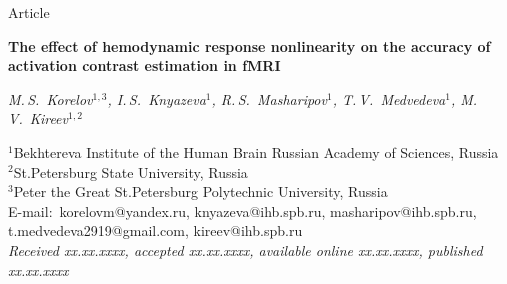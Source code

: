 \documentclass[11pt,twoside,a4paper]{article}
\newcommand{\published}{xx.xx.xxxx}
\renewcommand{\received}{xx.xx.xxxx}
\renewcommand{\accepted}{xx.xx.xxxx}
\renewcommand{\onlinepublished}{xx.xx.xxxx}
\renewcommand{\titpaperen}{The effect of hemodynamic response nonlinearity on the accuracy of activation contrast estimation in fMRI}
\begin{document}
\label{firstpage}
\thispagestyle{firststyle}
\vspace*{.2cm}
\infojournal
\vspace*{.8cm}

{\small \noindent
	Article\hfill \doi\\

}\vspace{.4cm}

\begin{center}\textbf{\large \titpaperen}
	\vspace{1\baselineskip}
	
\emph{M.\,S.~Korelov$^{1,3}$, I.\,S.~Knyazeva$^{1}$, R.\,S.~Masharipov$^{1}$, T.\,V.~Medvedeva$^{1}$, M.\,V.~Kireev$^{1,2}$}\vspace{.7\baselineskip}

\footnotesize{
	$^{1}$Bekhtereva Institute of the Human Brain Russian Academy of Sciences, Russia \\
	$^{2}$St.Petersburg State University, Russia\\
	$^{3}$Peter the Great St.Petersburg Polytechnic University, Russia\\
	E-mail: \Letter\,korelovm@yandex.ru, knyazeva@ihb.spb.ru, masharipov@ihb.spb.ru, t.medvedeva2919@gmail.com, kireev@ihb.spb.ru\\[1pt]
	\emph{Received  \received, accepted \accepted, available online \onlinepublished, published \published}	
		
	}
\end{center}\vspace{.5\baselineskip}
\end{document}
